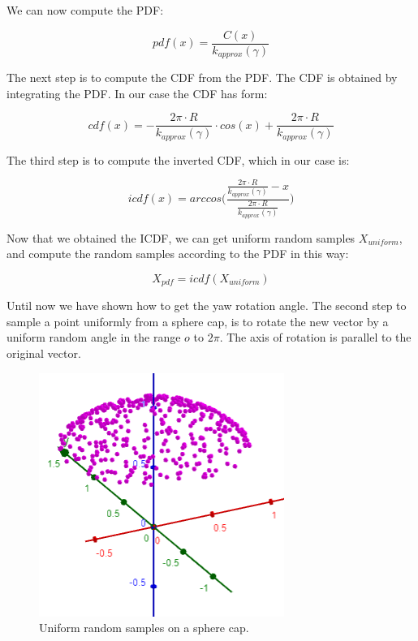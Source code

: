 \documentclass{PoliMi_MasterThesis}
\begin{document}
We can now compute the PDF:

$$pdf(x) = \frac{C(x)}{k_{approx}(\gamma)}$$

The next step is to compute the CDF from the PDF. The CDF is obtained by integrating the PDF. In our case the CDF has form:

$$cdf(x) = -\frac{2\pi \cdot R}{k_{approx}(\gamma)} \cdot cos(x) + \frac{2\pi \cdot R}{k_{approx}(\gamma)}$$

The third step is to compute the inverted CDF, which in our case is:

$$icdf(x) = arccos\Bigg(\frac{\frac{2\pi \cdot R}{k_{approx}(\gamma)}-x}{\frac{2\pi \cdot R}{k_{approx}(\gamma)}}\Bigg)$$

Now that we obtained the ICDF, we can get uniform random samples $X_{uniform}$, and compute the random samples according to the PDF in this way:

$$X_{pdf} = icdf(X_{uniform})$$

Until now we have shown how to get the yaw rotation angle. The second step to sample a point uniformly from a sphere cap, is to rotate the new vector by a uniform random angle in the range $o$ to $2\pi$. The axis of rotation is parallel to the original vector.

\begin{figure}[H]
    \centering
    \includegraphics[width=\textwidth*\real{0.45}]{Images/sphere_cap_samples.png} 
    \caption{Uniform random samples on a sphere cap.}
    \label{fig:samples_sphere_cap}
\end{figure}
\end{document}
